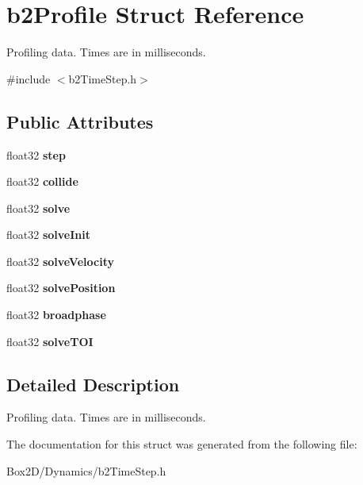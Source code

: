 \hypertarget{structb2_profile}{}\section{b2\+Profile Struct Reference}
\label{structb2_profile}


Profiling data. Times are in milliseconds.  




{\ttfamily \#include $<$b2\+Time\+Step.\+h$>$}

\subsection*{Public Attributes}
\begin{DoxyCompactItemize}
\item 
\mbox{\label{structb2_profile_a5b93de1d56902224868beacc478b9863}} 
float32 {\bfseries step}
\item 
\mbox{\label{structb2_profile_af827d9e54f7a4e94d0a023e18466b960}} 
float32 {\bfseries collide}
\item 
\mbox{\label{structb2_profile_afbefc05f05ec8bfd6cb2011929688a0b}} 
float32 {\bfseries solve}
\item 
\mbox{\label{structb2_profile_a010110900c27ccc88cd5e23b0e12e96e}} 
float32 {\bfseries solve\+Init}
\item 
\mbox{\label{structb2_profile_ae4d29a19b38de81621bccdbf75595233}} 
float32 {\bfseries solve\+Velocity}
\item 
\mbox{\label{structb2_profile_a78e22d104226863492ebab9ea30a9ed9}} 
float32 {\bfseries solve\+Position}
\item 
\mbox{\label{structb2_profile_a6bd556e43a6fa3853adad9fd71e56b44}} 
float32 {\bfseries broadphase}
\item 
\mbox{\label{structb2_profile_a74e8ea0c6ca39250d639ec94b69a803e}} 
float32 {\bfseries solve\+T\+OI}
\end{DoxyCompactItemize}


\subsection{Detailed Description}
Profiling data. Times are in milliseconds. 

The documentation for this struct was generated from the following file\+:\begin{DoxyCompactItemize}
\item 
Box2\+D/\+Dynamics/b2\+Time\+Step.\+h\end{DoxyCompactItemize}
